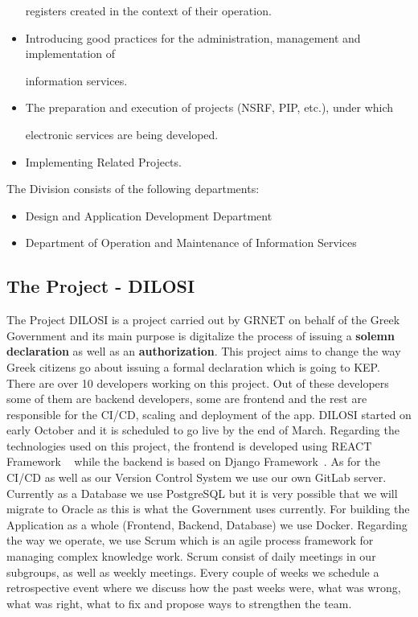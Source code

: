 \begin{itemize}
	registers created in the context of their operation.
	
	\item Introducing good practices for the administration, management and implementation of
	
	information services.
	
	\item The preparation and execution of projects (NSRF, PIP, etc.), under which
	
	electronic services are being developed.
	
	\item Implementing Related Projects.
\end{itemize}

The Division consists of the following departments:
\begin{itemize}
	
	\item Design and Application Development Department
	
	\item Department of Operation and Maintenance of Information Services
\end{itemize}

\subsection{The Project - DILOSI}
The Project DILOSI is a project carried out by GRNET on behalf of the Greek
Government and its main purpose is digitalize the process of issuing a \textbf{solemn
declaration} as well as an \textbf{authorization}. This project aims to change the way
Greek citizens go about issuing a formal declaration which is going to KEP.
There are over 10 developers working on this project. Out of these developers some
of them are backend developers, some are frontend and the rest are responsible for the
CI/CD, scaling and deployment of the app. DILOSI started on early October and it is scheduled
to go live by the end of March. Regarding the technologies used on this project, the frontend is
developed using REACT Framework ~\citep{react} while the backend is based on Django Framework~\citep{django}. As for the CI/CD as well as our Version Control System we use
our own GitLab server. Currently as a Database we use PostgreSQL but it is very possible that
we will migrate to Oracle as this is what the Government uses currently.
For building the Application as a whole (Frontend, Backend, Database) we
use Docker. Regarding the way we operate, we use Scrum which is an agile process
framework for managing complex knowledge work. Scrum consist of daily meetings in our subgroups,
as well as weekly meetings. Every couple of weeks we schedule a retrospective event where we discuss
how the past weeks were, what was wrong, what was right, what to fix and propose ways to strengthen
the team. 

